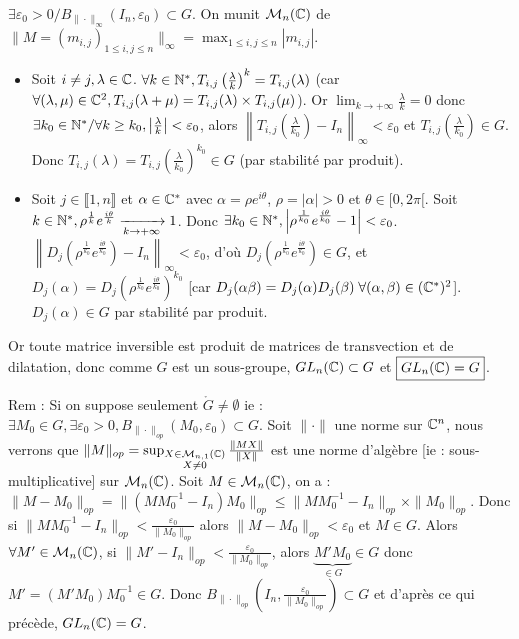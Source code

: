 \begin{solution}
$\exists \varepsilon_0 > 0 / B_{\|\cdot\|_\infty}(I_n, \varepsilon_0) \subset G$. On munit $\mathcal{M}_n(\mathbb C)$ de $\|M = (m_{i,j})_{1 \leq i, j \leq n}\|_\infty = \max_{1 \leq i, j \leq n} |m_{i,j}|$.
\begin{itemize}
  \item Soit $i \neq j, \lambda \in \mathbb C$. $\forall k \in \mathbb N^*, T_{i,j}\left(\frac{\lambda}{k}\right)^k = T_{i,j}(\lambda)$ (car $\forall (\lambda, \mu) \in \mathbb C^2, T_{i,j}(\lambda + \mu) = T_{i,j}(\lambda) \times T_{i,j}(\mu)$).
  Or $\lim_{k \to +\infty} \frac{\lambda}{k} = 0$ donc $\exists k_0 \in \mathbb N^* / \forall k \geq k_0, \left|\frac{\lambda}{k}\right| < \varepsilon_0$, alors $\left\|T_{i,j}\left(\frac{\lambda}{k_0}\right) - I_n\right\|_\infty < \varepsilon_0$ et $T_{i,j}\left(\frac{\lambda}{k_0}\right) \in G$. Donc $T_{i,j}(\lambda) = T_{i,j}\left(\frac{\lambda}{k_0}\right)^{k_0} \in G$ (par stabilité par produit).
  \item Soit $j \in \llbracket 1, n \rrbracket$ et $\alpha \in \mathbb C^*$ avec $\alpha = \rho e^{i\theta}$, $\rho = |\alpha| > 0$ et $\theta \in [0, 2\pi[$.
  Soit $k \in \mathbb N^*, \rho^{\frac{1}{k}} e^{\frac{i\theta}{k}} \xrightarrow[k \to +\infty]{} 1$. Donc $\exists k_0 \in \mathbb N^*, \left|\rho^{\frac{1}{k_0}} e^{\frac{i\theta}{k_0}} - 1\right| < \varepsilon_0$.
  $\left\|D_j\left(\rho^{\frac{1}{k_0}} e^{\frac{i\theta}{k_0}}\right) - I_n\right\|_\infty < \varepsilon_0$, d'où $D_j\left(\rho^{\frac{1}{k_0}} e^{\frac{i\theta}{k_0}}\right) \in G$, et $D_j(\alpha) = D_j\left(\rho^{\frac{1}{k_0}} e^{\frac{i\theta}{k_0}}\right)^{k_0}$ [car $D_j(\alpha \beta) = D_j(\alpha) D_j(\beta) \; \forall (\alpha, \beta) \in (\mathbb C^*)^2$].
  $D_j(\alpha) \in G$ par stabilité par produit.
\end{itemize}
Or toute matrice inversible est produit de matrices de transvection et de dilatation, donc comme $G$ est un sous-groupe, $GL_n(\mathbb C) \subset G$ et $\boxed{GL_n(\mathbb C) = G}$.

\begin{remarkbox}
Rem : Si on suppose seulement $\mathring{G} \neq \emptyset$ ie : $\exists M_0 \in G, \exists \varepsilon_0 > 0, B_{\|\cdot\|_{op}}(M_0, \varepsilon_0) \subset G$.
Soit $\|\cdot\|$ une norme sur $\mathbb C^n$, nous verrons que $\|M\|_{op} = \sup_{\substack{X \in \mathcal{M}_{n,1}(\mathbb C) \\ X \neq 0}} \frac{\|MX\|}{\|X\|}$ est une norme d'algèbre [ie : sous-multiplicative] sur $\mathcal{M}_n(\mathbb C)$.
Soit $M \in \mathcal{M}_n(\mathbb C)$, on a : $\|M - M_0\|_{op} = \|(M M_0^{-1} - I_n) M_0\|_{op} \leq \|M M_0^{-1} - I_n\|_{op} \times \|M_0\|_{op}$.
Donc si $\|M M_0^{-1} - I_n\|_{op} < \frac{\varepsilon_0}{\|M_0\|_{op}}$ alors $\|M - M_0\|_{op} < \varepsilon_0$ et $M \in G$.
Alors $\forall M' \in \mathcal{M}_n(\mathbb C)$, si $\|M' - I_n\|_{op} < \frac{\varepsilon_0}{\|M_0\|_{op}}$, alors $\underbrace{M' M_0}_{\in G} \in G$ donc $M' = (M' M_0) M_0^{-1} \in G$. Donc $B_{\|\cdot\|_{op}}\left(I_n, \frac{\varepsilon_0}{\|M_0\|_{op}}\right) \subset G$ et d'après ce qui précède, $GL_n(\mathbb C) = G$.
\end{remarkbox}
\end{solution}

